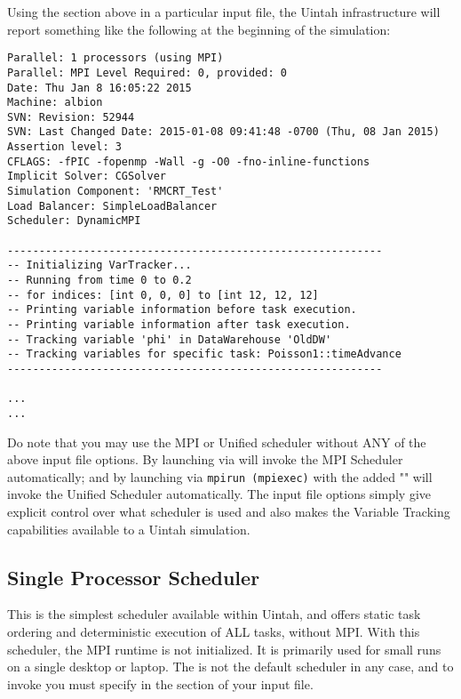 \noindent Using the  section above in a particular input file,
the Uintah infrastructure will report something like the following at the
beginning of the simulation:

\begin{Verbatim}[fontsize=\footnotesize]
Parallel: 1 processors (using MPI)
Parallel: MPI Level Required: 0, provided: 0
Date: Thu Jan 8 16:05:22 2015
Machine: albion
SVN: Revision: 52944
SVN: Last Changed Date: 2015-01-08 09:41:48 -0700 (Thu, 08 Jan 2015)
Assertion level: 3
CFLAGS: -fPIC -fopenmp -Wall -g -O0 -fno-inline-functions
Implicit Solver: CGSolver
Simulation Component: 'RMCRT_Test'
Load Balancer: SimpleLoadBalancer
Scheduler: DynamicMPI

-----------------------------------------------------------
-- Initializing VarTracker...
-- Running from time 0 to 0.2
-- for indices: [int 0, 0, 0] to [int 12, 12, 12]
-- Printing variable information before task execution.
-- Printing variable information after task execution.
-- Tracking variable 'phi' in DataWarehouse 'OldDW'
-- Tracking variables for specific task: Poisson1::timeAdvance
-----------------------------------------------------------

...
...
\end{Verbatim}

Do note that you may use the MPI or Unified scheduler without ANY of the above
input file options. By launching  via  will invoke
the MPI Scheduler automatically; and by launching  via \texttt{mpirun
(mpiexec)} with the added "" will invoke the Unified Scheduler
automatically. The input file options simply give explicit control over what
scheduler is used and also makes the Variable Tracking capabilities available
to a Uintah simulation.


\subsection{Single Processor Scheduler} \label{Sec:SingleProcessorScheduler}
This is the simplest scheduler available within Uintah, and offers
static task ordering and deterministic execution of ALL tasks, without MPI.
With this scheduler, the MPI runtime is not initialized. It is primarily used
for small runs on a single desktop or laptop. The 
is not the default scheduler in any case, and to invoke you must specify
 in the  section of your input file.


